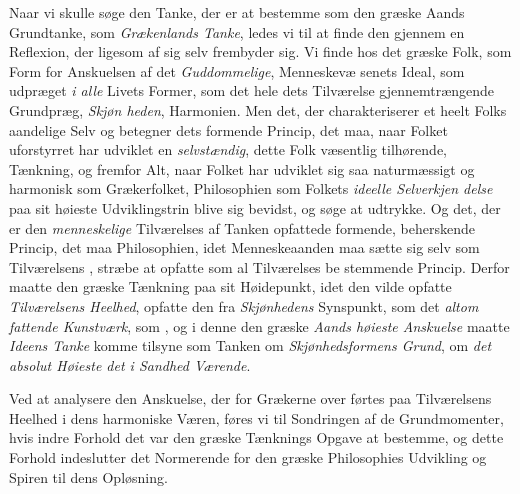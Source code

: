 Naar vi skulle søge den Tanke, der er at bestemme som
den græske Aands Grundtanke, som \emph{Grækenlands Tanke},
ledes vi til at finde den gjennem en Reflexion, der ligesom af
sig selv frembyder sig. Vi finde hos det græske Folk, som
Form for Anskuelsen af det \emph{Guddommelige}, Menneskevæ\-%
senets Ideal, som udpræget \emph{i alle} Livets Former, som det
hele dets Tilværelse gjennemtrængende Grundpræg, \emph{Skjøn\-%
heden}, Harmonien. Men det, der charakteriserer et heelt
Folks aandelige Selv og betegner dets formende Princip, det
maa, naar Folket uforstyrret har udviklet en \emph{selvstændig},
dette Folk væsentlig tilhørende, Tænkning, og fremfor Alt, naar
Folket har udviklet sig saa naturmæssigt og harmonisk som
Grækerfolket, Philosophien som Folkets \emph{ideelle Selverkjen\-%
delse} paa sit høieste Udviklingstrin blive sig bevidst, og søge
at udtrykke. Og det, der er den \emph{menneskelige} Tilværelses
af Tanken opfattede formende, beherskende Princip, det maa
Philosophien, idet Menneskeaanden maa sætte sig selv som
Tilværelsens , stræbe at opfatte som al Tilværelses be\-%
stemmende Princip. Derfor maatte den græske Tænkning paa sit
Høidepunkt, idet den vilde opfatte \emph{Tilværelsens Heelhed},
opfatte den fra \emph{Skjønhedens} Synspunkt, som det \emph{altom\-%
fattende Kunstværk}, som , og i denne den græske
\emph{Aands høieste Anskuelse} maatte \emph{Ideens Tanke} komme
tilsyne som Tanken om \emph{Skjønhedsformens Grund}, om
\emph{det absolut Høieste det i Sandhed Værende}.

Ved at analysere den Anskuelse, der for Grækerne over\-%
førtes paa Tilværelsens Heelhed i dens harmoniske Væren, føres
vi til Sondringen af de Grundmomenter, hvis indre Forhold
det var den græske Tænknings Opgave at bestemme, og dette
Forhold indeslutter det Normerende for den græske Philosophies
Udvikling og Spiren til dens Opløsning.

